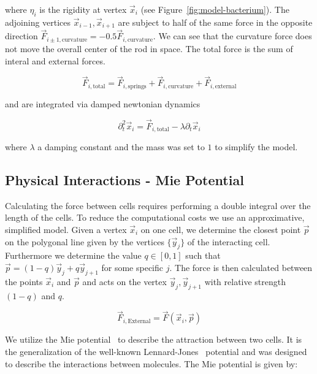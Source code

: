 \documentclass{article}
\begin{document}
where $\eta_i$ is the rigidity at vertex $\vec{x}_i$ (see Figure~\ref{fig:model-bacterium}).
The adjoining vertices $\vec{x}_{i-1},\vec{x}_{i+1}$ are subject to half of the same force in the
opposite direction $\vec{F}_{i\pm 1,\text{curvature}} = -0.5\vec{F}_{i,\text{curvature}}$.
We can see that the curvature force does not move the overall center of the rod in space.
The total force is the sum of interal and external forces.

\begin{equation}
    \vec{F}_{i,\text{total}} = \vec{F}_{i,\text{springs}}+ \vec{F}_{i,\text{curvature}}
        + \vec{F}_{i,\text{external}}
\end{equation}

and are integrated via damped newtonian dynamics

\begin{equation}
    \partial_t^2 \vec{x}_i = \vec{F}_{i,\text{total}} - \lambda \partial_t\vec{x}_i
\end{equation}

where $\lambda$ a damping constant and the mass was set to $1$ to simplify the model.

\subsection{Physical Interactions - Mie Potential}

Calculating the force between cells requires performing a double integral over the length of the
cells.
To reduce the computational costs we use an approximative, simplified model.
Given a vertex $\vec{x}_i$ on one cell, we determine the closest point $\vec{p}$ on the polygonal
line given by the vertices $\{\vec{y}_j\}$ of the interacting cell.
Furthermore we determine the value $q\in[0,1]$ such that $\vec{p} = (1-q)\vec{y}_j + q\vec{y}_{j+1}$
for some specific $j$.
The force is then calculated between the points $\vec{x}_i$ and $\vec{p}$ and acts on
the vertex $\vec{y}_j,\vec{y}_{j+1}$ with relative strength $(1-q)$ and $q$.

\begin{equation}
    \vec{F}_{i,\text{External}} = \vec{F}(\vec{x}_i,\vec{p})
\end{equation}

We utilize the Mie potential~\cite{Mie1903} to describe the attraction between two cells.
It is the generalization of the well-known Lennard-Jones~\cite{Jones1924} potential and was designed
to describe the interactions between molecules.
The Mie potential is given by:
\end{document}
